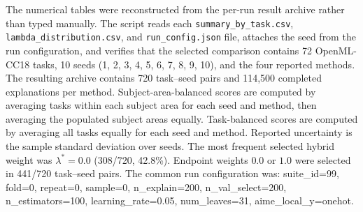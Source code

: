 The numerical tables were reconstructed from the per-run result archive rather than typed manually. The script reads each \texttt{summary\_by\_task.csv}, \texttt{lambda\_distribution.csv}, and \texttt{run\_config.json} file, attaches the seed from the run configuration, and verifies that the selected comparison contains 72 OpenML-CC18 tasks, 10 seeds (1, 2, 3, 4, 5, 6, 7, 8, 9, 10), and the four reported methods. The resulting archive contains 720 task--seed pairs and 114,500 completed explanations per method. Subject-area-balanced scores are computed by averaging tasks within each subject area for each seed and method, then averaging the populated subject areas equally. Task-balanced scores are computed by averaging all tasks equally for each seed and method. Reported uncertainty is the sample standard deviation over seeds. The most frequent selected hybrid weight was $\lambda^*=0.0$ (308/720, 42.8\%). Endpoint weights $0.0$ or $1.0$ were selected in 441/720 task--seed pairs. The common run configuration was: suite\_id=99, fold=0, repeat=0, sample=0, n\_explain=200, n\_val\_select=200, n\_estimators=100, learning\_rate=0.05, num\_leaves=31, aime\_local\_y=onehot.
